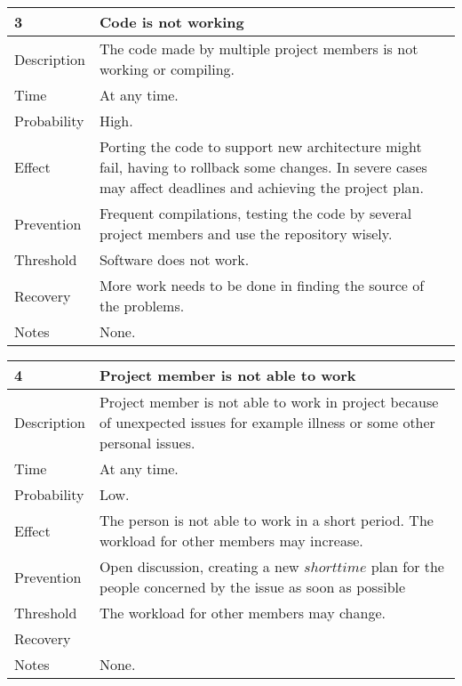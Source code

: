 \documentclass[12pt,titlepage,a4paper]{article}
\begin{document}
		\begin{center}
		\begin{tabular}{|l|p{10cm}|}
			\hline
			\textbf{3} & \textbf{Code is not working} \\
			\hline
			\hline
			Description & The code made by multiple project members is not working or compiling. \\
			\hline
			Time & At any time. \\
			\hline
			Probability & High. \\
			\hline
			Effect & Porting the code to support new architecture might fail, having to rollback some changes. In severe cases 				may affect deadlines and achieving the project plan.\\
			\hline
			Prevention & Frequent compilations, testing the code by several project members and use the repository wisely. \\
			\hline
			Threshold & Software does not work. \\
			\hline
			Recovery & More work needs to be done in finding the source of the problems. \\
			\hline
			Notes & None. \\
			\hline
		\end{tabular}
		\end{center}

		\begin{center}
		\begin{tabular}{|l|p{10cm}|}
			\hline
			\textbf{4} & \textbf{Project member is not able to work} \\
			\hline
			\hline
			Description & Project member is not able to work in project because of unexpected issues for example illness or 				some other personal issues. \\
			\hline
			Time & At any time. \\
			\hline
			Probability & Low. \\
			\hline
			Effect & The person is not able to work in a short period. The workload for other members may increase. \\
			\hline
			Prevention & Open discussion, creating a new \(short time\) plan for the people concerned by the issue as soon as 			possible \\
			\hline
			Threshold & The workload for other members may change. \\
			\hline
			Recovery &  \\
			\hline
			Notes & None. \\
			\hline
		\end{tabular}
		\end{center}
	
\end{document}
